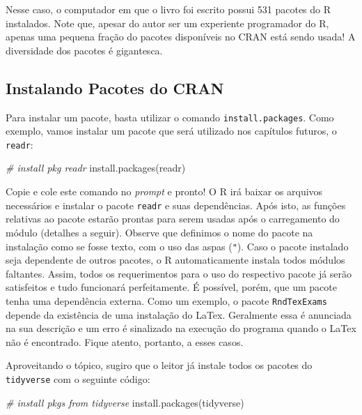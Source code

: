 \documentclass[
  11pt,
]{book}
\newenvironment{Shaded}{\begin{snugshade}}{\end{snugshade}}
\newcommand{\CommentTok}[1]{\textcolor[rgb]{0.37,0.37,0.37}{\textit{#1}}}
\newcommand{\FunctionTok}[1]{\textcolor[rgb]{0,0,0}{#1}}
\newcommand{\NormalTok}[1]{#1}
\newcommand{\StringTok}[1]{\textcolor[rgb]{0.5,0.5,0.5}{#1}}
\begin{document}
Nesse caso, o computador em que o livro foi escrito possui 531 pacotes do R instalados. Note que, apesar do autor ser um experiente programador do R, apenas uma pequena fração do pacotes disponíveis no CRAN está sendo usada! A diversidade dos pacotes é gigantesca.

\hypertarget{instalando-pacotes-do-cran}{%
\subsection{Instalando Pacotes do CRAN}\label{instalando-pacotes-do-cran}}

Para instalar um pacote, basta utilizar o comando \texttt{install.packages}. Como exemplo, vamos instalar um pacote que será utilizado nos capítulos futuros, o \texttt{readr}: 

\begin{Shaded}
\begin{Highlighting}[]
\CommentTok{\# install pkg readr}
\FunctionTok{install.packages}\NormalTok{(}\StringTok{\textquotesingle{}readr\textquotesingle{}}\NormalTok{)}
\end{Highlighting}
\end{Shaded}

Copie e cole este comando no \emph{prompt} e pronto! O R irá baixar os arquivos necessários e instalar o pacote \texttt{readr} e suas dependências. Após isto, as funções relativas ao pacote estarão prontas para serem usadas após o carregamento do módulo (detalhes a seguir). Observe que definimos o nome do pacote na instalação como se fosse texto, com o uso das aspas (\texttt{"}). Caso o pacote instalado seja dependente de outros pacotes, o R automaticamente instala todos módulos faltantes. Assim, todos os requerimentos para o uso do respectivo pacote já serão satisfeitos e tudo funcionará perfeitamente. É possível, porém, que um pacote tenha uma dependência externa. Como um exemplo, o pacote \texttt{RndTexExams} depende da existência de uma instalação do LaTex. Geralmente essa é anunciada na sua descrição e um erro é sinalizado na execução do programa quando o LaTex não é encontrado. Fique atento, portanto, a esses casos.

Aproveitando o tópico, sugiro que o leitor já instale todos os pacotes do \texttt{tidyverse} com o seguinte código:

\begin{Shaded}
\begin{Highlighting}[]
\CommentTok{\# install pkgs from tidyverse}
\FunctionTok{install.packages}\NormalTok{(}\StringTok{\textquotesingle{}tidyverse\textquotesingle{}}\NormalTok{)}
\end{Highlighting}
\end{Shaded}
\end{document}
